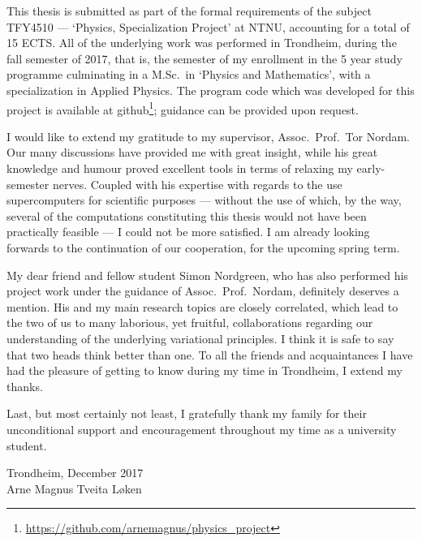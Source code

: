 This thesis is submitted as part of the formal requirements of the subject
TFY4510 --- `Physics, Specialization Project' at NTNU, accounting for a total
of 15 ECTS. All of the underlying work was performed in Trondheim, during the
fall semester of 2017, that is, the  semester of my enrollment in the
5 year study programme culminating in a M.Sc.\ in `Physics and Mathematics',
with a specialization in Applied Physics. The program code which was developed
for this project is available at
github\footnote{\url{https://github.com/arnemagnus/physics_project}}; guidance
can be provided upon request.
%

I would like to extend my gratitude to my supervisor, Assoc.\ Prof.\
Tor Nordam. Our many discussions have provided me with great insight, while
his great knowledge and humour proved excellent tools in terms
of relaxing my early-semester nerves.
Coupled with his expertise with regards to the use supercomputers for scientific
purposes --- without the use of which, by the
way, several of the computations constituting this thesis would not have been
practically feasible --- I could not be more satisfied. I am already looking
forwards to the continuation of our cooperation, for the upcoming spring term.

My dear friend and fellow student Simon Nordgreen, who has also performed his
project work under the guidance of Assoc.\ Prof.\ Nordam, definitely
deserves a mention. His and my main research topics are closely correlated,
which lead to the two of us to many laborious, yet fruitful, collaborations
regarding our understanding of the underlying variational principles. I think it
is safe to say that two heads think better than one. To all the friends and
acquaintances I have had the pleasure of getting to know during my
time in Trondheim, I extend my thanks.

Last, but most certainly not least, I gratefully thank my family for their
unconditional support and encouragement throughout my time as a university
student.


\begin{minipage}[t]{\textwidth}
    \begin{flushright}
    Trondheim, December 2017\\
    Arne Magnus Tveita Løken
    \end{flushright}
\end{minipage}
